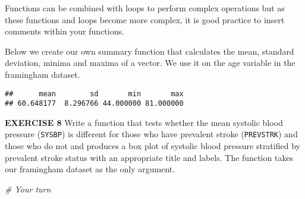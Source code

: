 \documentclass[
]{article}
\newenvironment{Shaded}{\begin{snugshade}}{\end{snugshade}}
\newcommand{\CommentTok}[1]{\textcolor[rgb]{0.56,0.35,0.01}{\textit{#1}}}
\newcommand{\ControlFlowTok}[1]{\textcolor[rgb]{0.13,0.29,0.53}{\textbf{#1}}}
\newcommand{\KeywordTok}[1]{\textcolor[rgb]{0.13,0.29,0.53}{\textbf{#1}}}
\newcommand{\NormalTok}[1]{#1}
\newcommand{\OperatorTok}[1]{\textcolor[rgb]{0.81,0.36,0.00}{\textbf{#1}}}
\newcommand{\StringTok}[1]{\textcolor[rgb]{0.31,0.60,0.02}{#1}}
\begin{document}
Functions can be combined with loops to perform complex operations but
as these functions and loops become more complex, it is good practice to
insert comments within your functions.

Below we create our own summary function that calculates the mean,
standard deviation, minima and maxima of a vector. We use it on the age
variable in the framingham dataset.

\begin{Shaded}
\end{Shaded}

\begin{verbatim}
##      mean        sd       min       max 
## 60.648177  8.296766 44.000000 81.000000
\end{verbatim}

\textbf{EXERCISE 8} Write a function that tests whether the mean
systolic blood pressure (\texttt{SYSBP}) is different for those who have
prevalent stroke (\texttt{PREVSTRK}) and those who do not and produces a
box plot of systolic blood pressure stratified by prevalent stroke
status with an appropriate title and labels. The function takes our
framingham dataset as the only argument.

\begin{Shaded}
\begin{Highlighting}[]
\CommentTok{# Your turn}
\end{Highlighting}
\end{Shaded}
\end{document}
